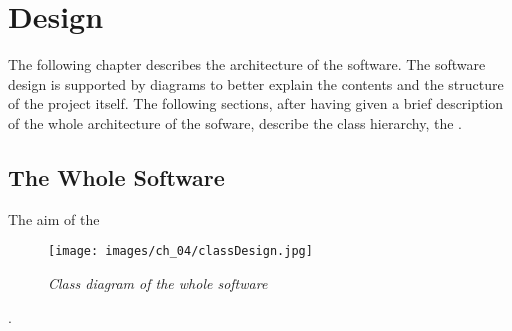 \chapter{Design}
 
  The following chapter describes the architecture of the software. 
  The software design is supported by diagrams to better explain the contents and the structure of the project itself. The following sections, after having given a brief description of the whole architecture of the sofware, describe the class hierarchy, the .
  
  \section{The Whole Software}
  The aim of the 
  \begin{figure}[h]
	  \begin{center} 
	    \texttt{[image: images/ch\_04/classDesign.jpg]}
	  \end{center} 
	  \caption{\textit{Class diagram of the whole software }}  
	  \label{fig:swArchitecture}
  \end{figure}
  .

  
